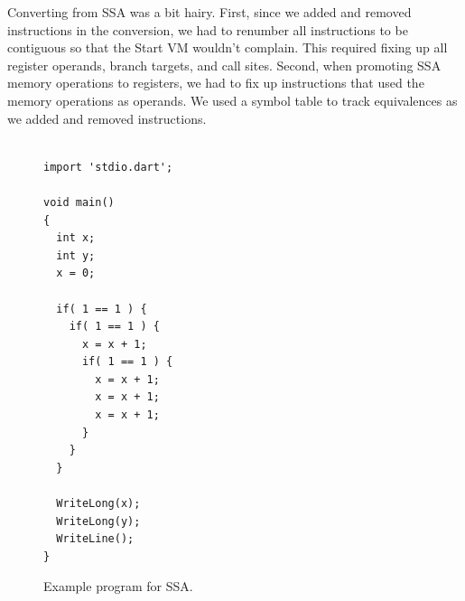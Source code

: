 \documentclass[10pt,twocolumn]{article}
\begin{document}
Converting from SSA was a bit hairy. First, since we added and removed
instructions in the conversion, we had to renumber all instructions to
be contiguous so that the Start VM wouldn't complain. This required
fixing up all register operands, branch targets, and call
sites. Second, when promoting SSA memory operations to registers, we
had to fix up instructions that used the memory operations as
operands. We used a symbol table to track equivalences as we added and
removed instructions.

\begin{figure}
\begin{center}
  \begin{verbatim}

import 'stdio.dart';

void main()
{
  int x;
  int y;
  x = 0;

  if( 1 == 1 ) {
    if( 1 == 1 ) {
      x = x + 1;
      if( 1 == 1 ) {
        x = x + 1;
        x = x + 1;
        x = x + 1;
      }
    }
  }

  WriteLong(x);
  WriteLong(y);
  WriteLine();
}

\end{verbatim}
\begin{minipage}{0.95\columnwidth}
  \caption{\label{fig:ssa-code} Example program for SSA.}
\end{minipage}
\end{center}
\end{figure}
\end{document}
